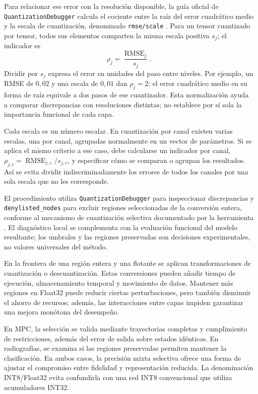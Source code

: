 Para relacionar ese error con la resolución disponible, la guía oficial de \texttt{Quantization\allowbreak Debugger} calcula el cociente entre la raíz del error cuadrático medio y la escala de cuantización, denominado \texttt{rmse/scale} \cite{litertdebug}. Para un tensor cuantizado por tensor, todos sus elementos comparten la misma escala positiva $s_j$; el indicador es
\begin{equation}
\rho_j=\frac{\operatorname{RMSE}_j}{s_j}.
\label{eq:cap3_rho}
\end{equation}
Dividir por $s_j$ expresa el error en unidades del paso entre niveles. Por ejemplo, un RMSE de $0{,}02$ y una escala de $0{,}01$ dan $\rho_j=2$: el error cuadrático medio en su forma de raíz equivale a dos pasos de ese cuantizador. Esta normalización ayuda a comparar discrepancias con resoluciones distintas; no establece por sí sola la importancia funcional de cada capa.

Cada escala es un número escalar. En cuantización por canal existen varias escalas, una por canal, agrupadas normalmente en un vector de parámetros. Si se aplica el mismo criterio a ese caso, debe calcularse un indicador por canal, $\rho_{j,c}=\operatorname{RMSE}_{j,c}/s_{j,c}$, y especificar cómo se comparan o agrupan los resultados. Así se evita dividir indiscriminadamente los errores de todos los canales por una sola escala que no les corresponde.

El procedimiento utiliza \texttt{Quantization\allowbreak Debugger} para inspeccionar discrepancias y \texttt{denylisted\_nodes} para excluir regiones seleccionadas de la conversión entera, conforme al mecanismo de cuantización selectiva documentado por la herramienta \cite{litertdebug}. El diagnóstico local se complementa con la evaluación funcional del modelo resultante; los umbrales y las regiones preservadas son decisiones experimentales, no valores universales del método.

En la frontera de una región entera y una flotante se aplican transformaciones de cuantización o descuantización. Estas conversiones pueden añadir tiempo de ejecución, almacenamiento temporal y movimiento de datos. Mantener más regiones en Float32 puede reducir ciertas perturbaciones, pero también disminuir el ahorro de recursos; además, las interacciones entre capas impiden garantizar una mejora monótona del desempeño.

En MPC, la selección se valida mediante trayectorias completas y cumplimiento de restricciones, además del error de salida sobre estados idénticos. En radiografías, se examina si las regiones preservadas permiten mantener la clasificación. En ambos casos, la precisión mixta selectiva ofrece una forma de ajustar el compromiso entre fidelidad y representación reducida. La denominación INT8/Float32 evita confundirla con una red INT8 convencional que utiliza acumuladores INT32.

